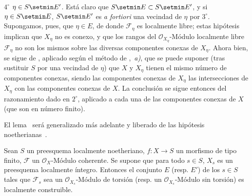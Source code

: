 $4^\circ$ $\eta\in S\setmin E'$.
Está claro que $S\setmin E\subset S\setmin E'$, y si $\eta\in S\setmin E$, $S\setmin E'$ es \emph{a fortiori} una vecindad de $\eta$ por $3^\circ$.
Supongamos, pues, que $\eta\in E$, de donde $\mathcal F_\eta$ es localmente libre; estas hipótesis implican que $X_\eta$ no es conexo, y que los rangos del $\mathcal O_{X_\eta}$-Módulo localmente libre $\mathcal F_\eta$ no son los mismos sobre las diversas componentes conexas de $X_\eta$.
Ahora bien, se sigue de , aplicado según el método de ,~\emph{a)}, que se puede suponer (tras sustituir $S$ por una vecindad de $\eta$) que $X$ y $X_\eta$ tienen el mismo número de componentes conexas, siendo las componentes conexas de $X_\eta$ las intersecciones de $X_\eta$ con las componentes conexas de $X$.
La conclusión se sigue entonces del razonamiento dado en $2^\circ$, aplicado a cada una de las componentes conexas de $X$ (que son en número finito).

\begin{remark}[9.4.7.2]
\label{IV.9.4.7.2}
El lema~ será generalizado más adelante y liberado de las hipótesis noetherianas~.
\end{remark}

\begin{proposition}[9.4.8]
\label{IV.9.4.8}
Sean $S$ un preesquema localmente noetheriano, $f:X\to S$ un morfismo de tipo
finito, $\mathcal F$ un $\mathcal O_X$-Módulo coherente. Se supone que para todo
$s\in S$, $X_s$ es un preesquema localmente íntegro. Entonces el conjunto $E$
\textnormal{(resp.} $E'$\textnormal{)} de los $s\in S$ tales que $\mathcal F_s$
sea un $\mathcal O_{X_s}$-Módulo de torsión \textnormal{(resp.} un
$\mathcal O_{X_s}$-Módulo sin torsión\textnormal{)} es localmente
construible.
\end{proposition}

